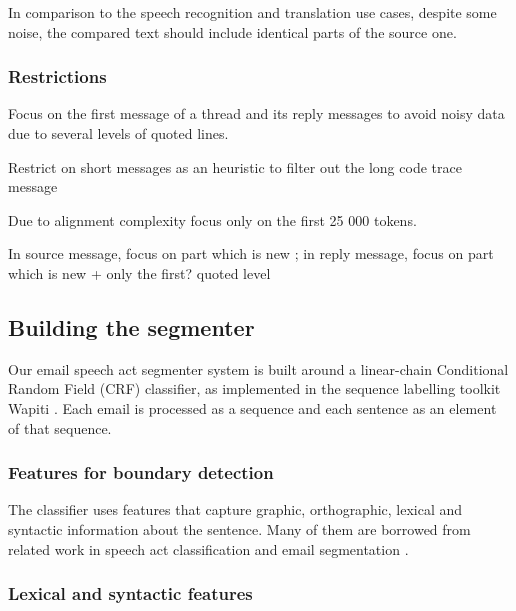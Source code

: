 
In comparison to the speech recognition and translation use cases, despite some noise, the compared text should include identical parts of the source one.



\subsubsection{Restrictions}
\label{}

Focus on the first message of a thread and its reply messages to avoid noisy data due to several levels of quoted lines.

Restrict on short messages as an heuristic to filter out the long code trace message

Due to alignment complexity focus only on the first 25 000 tokens.

In source message, focus on part which is new ; in reply message, focus on part which is new + only the first? quoted level 
 


\subsection{Building the segmenter}


Our email speech act segmenter system is built around a linear-chain Conditional Random Field (CRF) classifier, as implemented in the sequence labelling toolkit Wapiti \cite{lavergne2010practical}. Each email is processed as a sequence and each sentence as an element of that sequence.

\subsubsection{Features for boundary detection}

The classifier uses features that capture graphic, orthographic, lexical and syntactic information about the sentence. Many of them are borrowed from related work in speech act classification \cite{qadir2011classifying} and email segmentation \cite{lampert2009segmenting}.

\subsubsection{Lexical and syntactic features}

